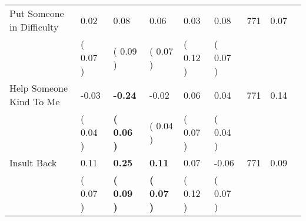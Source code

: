 \begin{tabular}{L{6.2cm} C{1.8cm} C{1.8cm} C{1.8cm} C{1.8cm} C{1.8cm} C{1.8cm} C{0.3cm} C{0.3cm}}
Put Someone in Difficulty &      0.02 &      0.08 &      0.06 &      0.03 &      0.08  & 771 &       0.07 \\ 
 & (     0.07 ) & (     0.09 ) & (     0.07 ) & (     0.12 ) & (     0.07 )  & \\
Help Someone Kind To Me &     -0.03 & \textbf{    -0.24} &     -0.02 &      0.06 &      0.04  & 771 &       0.14 \\ 
 & (     0.04 ) & \textbf{(     0.06 )} & (     0.04 ) & (     0.07 ) & (     0.04 )  & \\
Insult Back &      0.11 & \textbf{     0.25} & \textbf{     0.11} &      0.07 &     -0.06  & 771 &       0.09 \\ 
 & (     0.07 ) & \textbf{(     0.09 )} & \textbf{(     0.07 )} & (     0.12 ) & (     0.07 )  & \\
\bottomrule
\end{tabular}
